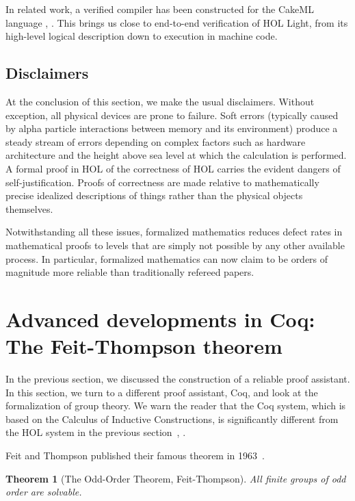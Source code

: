 \documentclass[brochure,english,12pt]{bourbaki}
\theoremstyle{plain}
\newtheorem{theorem}[equation]{Theorem}
\begin{document}
In related work, a verified compiler has been constructed for the CakeML language 
 \cite{CakeML}, \cite{sarkar2009semantics}.
This brings us close to end-to-end verification of HOL Light, from its high-level logical description down to
execution in machine code.



\bigskip


\subsection{Disclaimers}

At the conclusion of this section, we make the usual disclaimers.
Without exception, all physical devices are prone to failure.  Soft errors (typically 
caused by alpha particle interactions between memory and its environment) 
produce a steady
stream of errors depending on complex factors such as hardware architecture and
the height above sea level at which the
calculation is performed.  A formal proof in HOL of the correctness of HOL carries
the evident dangers of self-justification.  Proofs of correctness are made relative to 
mathematically precise idealized descriptions of things rather than the physical objects
themselves.

Notwithstanding all these issues,  formalized mathematics reduces defect rates
in mathematical proofs to levels that are simply not possible by any other available process.
In particular, formalized mathematics can now claim to be orders of magnitude more reliable than 
traditionally refereed papers.  



\section{Advanced developments in Coq: The Feit-Thompson theorem}

In the previous section, we discussed the construction of a reliable proof assistant.  In this section,
we turn to a different proof assistant, Coq, and look at the formalization of group theory.
We warn the reader that the Coq system, which is based on the Calculus of Inductive Constructions, 
is significantly different from the HOL system in the previous section~\cite{coq}, \cite{CiC}.



Feit and Thompson published their famous theorem in 1963~\cite{FT}.

\begin{theorem}[The Odd-Order Theorem, Feit-Thompson]  All finite groups of odd order are solvable.
\end{theorem}
\end{document}
